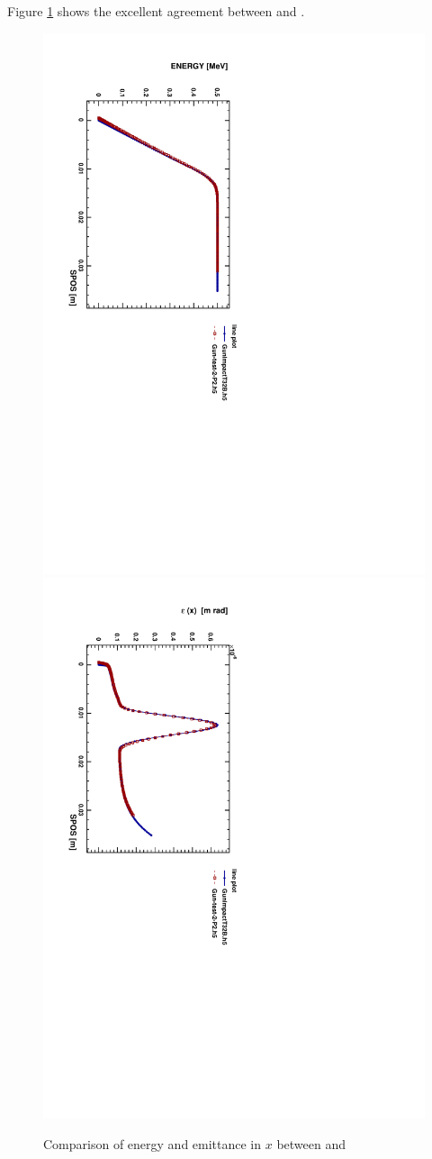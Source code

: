 Figure \ref{fig:guncomp2} shows the excellent agreement between \impactt and \opalt.

\begin{figure}[ht]
 \begin{center} 
   \includegraphics[width=0.6\linewidth,angle=90]{figures/Gun/GunCompEn}
   \includegraphics[width=0.6\linewidth,angle=90]{figures/Gun/GunCompEx}
   \caption{Comparison of energy and emittance in $x$ between \impactt and \opalt}   
   \label{fig:guncomp2}
 \end{center}
\end{figure}

